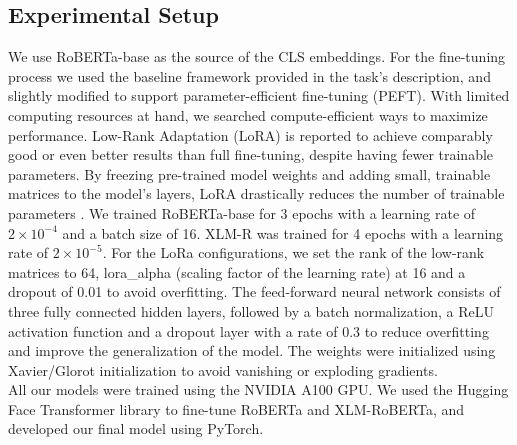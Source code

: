 \documentclass[11pt]{article}
\begin{document}
\subsection{Experimental Setup}
We use RoBERTa-base as the source of the CLS embeddings. For the fine-tuning process we used the baseline 
framework provided in the task's description, and slightly modified to support parameter-efficient fine-tuning (PEFT). 
With limited computing resources at hand, we searched compute-efficient ways to maximize performance. Low-Rank Adaptation (LoRA) is reported to achieve comparably good or even better results than full fine-tuning,
despite having fewer trainable parameters. By freezing pre-trained model weights and adding small, trainable matrices to the 
model's layers, LoRA drastically reduces the number of trainable parameters \cite{hu2022lora}. We trained RoBERTa-base for 3 epochs with a learning rate of \(2 \times 10^{-4}\) and a batch size of 16. XLM-R was trained for 4 epochs with a learning rate of \(2 \times 10^{-5}\). For the LoRa configurations, we set the rank of the low-rank matrices to 64, 
lora\_alpha (scaling factor of the learning rate) at 16 and a dropout of 0.01 to avoid overfitting. 
The feed-forward neural network consists of three fully connected hidden layers, followed by a batch normalization, a ReLU activation function and a dropout layer 
with a rate of 0.3 to reduce overfitting and improve the generalization of the model. The weights were initialized using Xavier/Glorot initialization to avoid 
vanishing or exploding gradients.\\

All our models were trained using the NVIDIA A100 GPU. We used the Hugging Face Transformer library to fine-tune RoBERTa and XLM-RoBERTa, and
developed our final model using PyTorch. 
\end{document}
